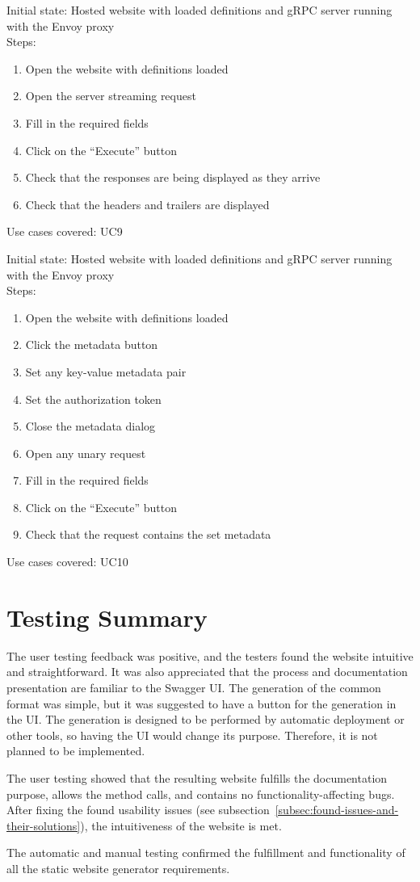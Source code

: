 Initial state: Hosted website with loaded definitions and gRPC server running with the Envoy proxy\\
Steps:
\begin{enumerate}
    \item Open the website with definitions loaded
    \item Open the server streaming request
    \item Fill in the required fields
    \item Click on the \enquote{Execute} button
    \item Check that the responses are being displayed as they arrive
    \item Check that the headers and trailers are displayed
\end{enumerate}
Use cases covered: UC9

Initial state: Hosted website with loaded definitions and gRPC server running with the Envoy proxy\\
Steps:
\begin{enumerate}
    \item Open the website with definitions loaded
    \item Click the metadata button
    \item Set any key-value metadata pair
    \item Set the authorization token
    \item Close the metadata dialog
    \item Open any unary request
    \item Fill in the required fields
    \item Click on the \enquote{Execute} button
    \item Check that the request contains the set metadata
\end{enumerate}
Use cases covered: UC10





\section{Testing Summary}
The user testing feedback was positive, and the testers found the website intuitive and straightforward.
It was also appreciated that the process and documentation presentation are familiar to the Swagger UI\@.
The generation of the common format was simple, but it was suggested to have a button for the generation in the UI\@.
The generation is designed to be performed by automatic deployment or other tools, so having the UI would change its purpose.
Therefore, it is not planned to be implemented.

The user testing showed that the resulting website fulfills the documentation purpose, allows the method calls, and contains no functionality-affecting bugs.
After fixing the found usability issues (see subsection~\ref{subsec:found-issues-and-their-solutions}), the intuitiveness of the website is met.

The automatic and manual testing confirmed the fulfillment and functionality of all the static website generator requirements.